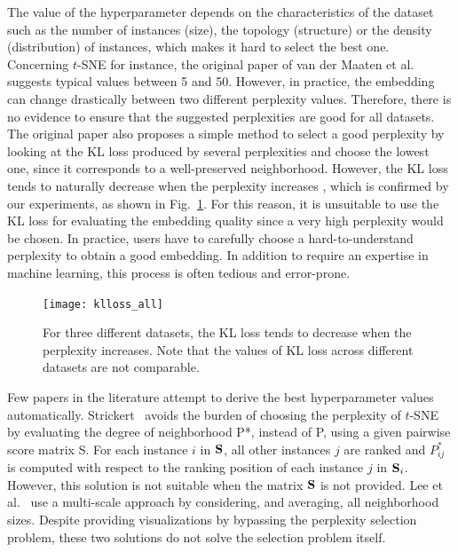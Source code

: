 The value of the hyperparameter depends on the characteristics of the dataset such as the number of instances (size), the topology (structure) or the density (distribution) of instances, which makes it hard to select the best one.
Concerning $t$-SNE for instance, the original paper of van der Maaten et al. \cite{maaten2008tsne} suggests typical values between 5 and 50.
However, in practice, the embedding can change drastically between two different perplexity values. Therefore, there is no evidence to ensure that the suggested perplexities are good for all datasets.
The original paper also proposes a simple method to select a good perplexity by looking at the KL loss produced by several perplexities and choose the lowest one, since it corresponds to a well-preserved neighborhood.
However, the KL loss tends to naturally decrease when the perplexity increases \cite{cao2017automatic}, which  is confirmed by our experiments, as shown in Fig.~\ref{fig:klloss}. For this reason, it is unsuitable to use the KL loss for evaluating the embedding quality since a very high perplexity would be chosen.
In practice, users have to carefully choose a hard-to-understand perplexity to obtain a good embedding.
In addition to require an expertise in machine learning, this process is often tedious and error-prone.

\begin{figure}
    \centering
    \texttt{[image: klloss\_all]}
    \caption{For three different datasets, the KL loss tends to decrease when the perplexity increases. Note that the values of KL loss across different datasets are not comparable.}
    \label{fig:klloss}
\end{figure}

Few papers in the literature attempt to derive the best hyperparameter values automatically.
Strickert~\cite{strickert2012} avoids the burden of choosing the perplexity of $t$-SNE by evaluating the degree of neighborhood P*, instead of P, using a given pairwise score matrix S. For each instance $i$ in ${\bf S}$, all other instances $j$ are ranked and ${P}^*_{ij}$ is computed with respect to the ranking position of each instance $j$ in ${\bf S}_i$. However, this solution is not suitable when the matrix ${\bf S}$ is not provided.
Lee et al.~\cite{lee2014} use a multi-scale approach by considering, and averaging, all neighborhood sizes. Despite providing visualizations by bypassing the perplexity selection problem, these two solutions do not solve the selection problem itself.

